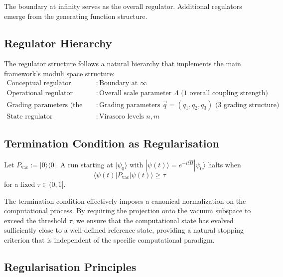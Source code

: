 The boundary at infinity serves as the overall regulator. Additional regulators emerge from the generating function structure.

\subsection{Regulator Hierarchy}

\begin{remark}
\label{rem:regulator-hierarchy}
The regulator structure follows a natural hierarchy that implements the main framework's moduli space structure:
\begin{align}
\text{Conceptual regulator} &: \text{Boundary at } \infty \\
\text{Operational regulator} &: \text{Overall scale parameter } \Lambda \text{ (1 overall coupling strength)} \\
\text{Grading parameters (the regulator trio)} &: \text{Grading parameters } \vec{q} = (q_1, q_2, q_3) \text{ (3 grading structure)} \\
\text{State regulator} &: \text{Virasoro levels } n, m
\end{align}
\end{remark}

\subsection{Termination Condition as Regularisation}

\begin{definition}
\label{def:termination-observable}
Let $P_{\mathrm{vac}}:=|0\rangle\langle 0|$. A run starting at $|\psi_0\rangle$ with $|\psi(t)\rangle=e^{-it\hat H}|\psi_0\rangle$ halts when
\[
\langle \psi(t)|P_{\mathrm{vac}}|\psi(t)\rangle\ge \tau
\]
for a fixed $\tau\in(0,1]$.
\end{definition}

The termination condition effectively imposes a canonical normalization on the computational process. By requiring the projection onto the vacuum subspace to exceed the threshold $\tau$, we ensure that the computational state has evolved sufficiently close to a well-defined reference state, providing a natural stopping criterion that is independent of the specific computational paradigm.


\subsection{Regularisation Principles}

